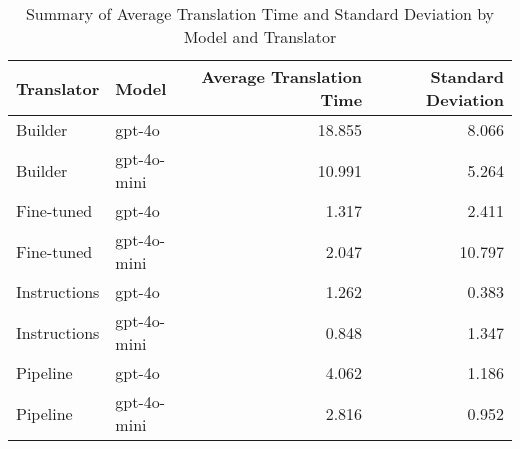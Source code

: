 \begin{table}
\caption{Summary of Average Translation Time and Standard Deviation by Model and Translator}
\label{tab:average_translation_time_summary}
\begin{tabular}{llrr}
\toprule
Translator & Model & Average Translation Time & Standard Deviation \\
\midrule
Builder & gpt-4o & 18.855 & 8.066 \\
Builder & gpt-4o-mini & 10.991 & 5.264 \\
Fine-tuned & gpt-4o & 1.317 & 2.411 \\
Fine-tuned & gpt-4o-mini & 2.047 & 10.797 \\
Instructions & gpt-4o & 1.262 & 0.383 \\
Instructions & gpt-4o-mini & 0.848 & 1.347 \\
Pipeline & gpt-4o & 4.062 & 1.186 \\
Pipeline & gpt-4o-mini & 2.816 & 0.952 \\
\bottomrule
\end{tabular}
\end{table}
